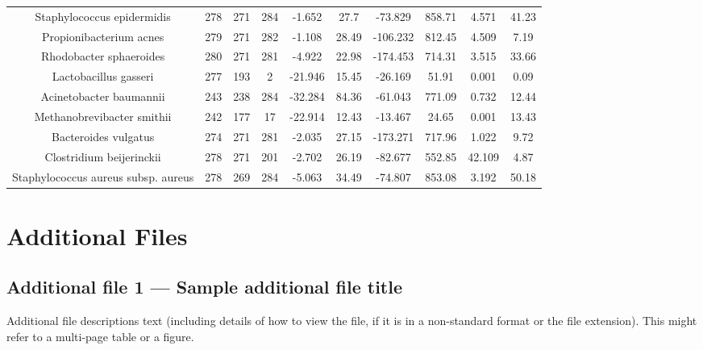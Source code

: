\documentclass[10pt]{bmc_article}
\newenvironment{bmcformat}{\begin{raggedright}\baselineskip20pt\sloppy\setboolean{publ}{false}}{\end{raggedright}\baselineskip20pt\sloppy}
\begin{document}
\begin{bmcformat}
{\begin{tabular}{|c|c|c|c|c|c|c|c|c|c|}
        Staphylococcus epidermidis & 278 & 271 & 284 & -1.652 & 27.7 & -73.829 & 858.71 & 4.571 & 41.23 \\
        Propionibacterium acnes & 279 & 271 & 282 & -1.108 & 28.49 & -106.232 & 812.45 & 4.509 & 7.19 \\
        Rhodobacter sphaeroides & 280 & 271 & 281 & -4.922 & 22.98 & -174.453 & 714.31 & 3.515 & 33.66 \\
        Lactobacillus gasseri & 277 & 193 & 2 & -21.946 & 15.45 & -26.169 & 51.91 & 0.001 & 0.09 \\
        Acinetobacter baumannii & 243 & 238 & 284 & -32.284 & 84.36 & -61.043 & 771.09 & 0.732 & 12.44 \\
        Methanobrevibacter smithii & 242 & 177 & 17 & -22.914 & 12.43 & -13.467 & 24.65 & 0.001 & 13.43 \\
        Bacteroides vulgatus & 274 & 271 & 281 & -2.035 & 27.15 & -173.271 & 717.96 & 1.022 & 9.72 \\
        Clostridium beijerinckii & 278 & 271 & 201 & -2.702 & 26.19 & -82.677 & 552.85 & 42.109 & 4.87 \\
        Staphylococcus aureus subsp. aureus & 278 & 269 & 284 & -5.063 & 34.49 & -74.807 & 853.08 & 3.192 & 50.18 \\
        \hline
      \end{tabular}
    }



\section*{Additional Files}
  \subsection*{Additional file 1 --- Sample additional file title}
    Additional file descriptions text (including details of how to
    view the file, if it is in a non-standard format or the file extension).  This might
    refer to a multi-page table or a figure.


\end{bmcformat}
\end{document}
